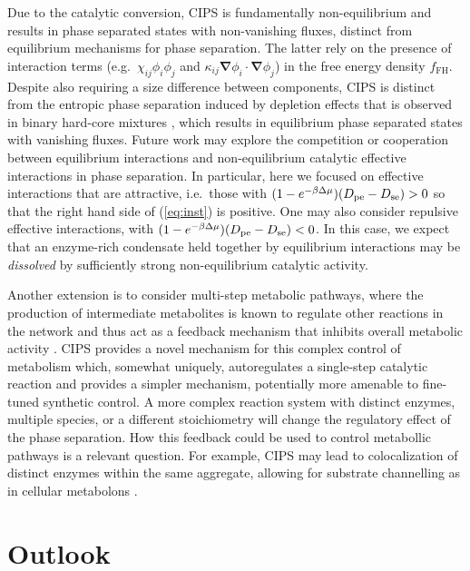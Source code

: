 Due to the catalytic conversion, CIPS is fundamentally non-equilibrium and results in phase separated states with non-vanishing fluxes, distinct from equilibrium mechanisms for phase separation. The latter rely on the presence of interaction terms (e.g.~$\chi_{ij}\phi_i\phi_j$ and $\kappa_{ij}\bm{\nabla} \phi_i \cdot \bm{\nabla} \phi_j$) in the free energy density $f_\mathrm{FH}$. Despite also requiring a size difference between components, CIPS is distinct from the entropic phase separation induced by depletion effects that is observed in binary hard-core mixtures \cite{frenkel_phase_1992}, which results in equilibrium phase separated states with vanishing fluxes. Future work may explore the competition or cooperation between equilibrium interactions and non-equilibrium catalytic effective interactions in phase separation. In particular, here we focused on effective interactions that are attractive, i.e.~those with $(1-e^{-\beta \Delta \mu})(D_{\mathrm{pe}}-D_{\mathrm{se}})>0$ so that the right hand side of (\ref{eq:inst}) is positive. One may also consider repulsive effective interactions, with $(1-e^{-\beta \Delta \mu})(D_{\mathrm{pe}}-D_{\mathrm{se}})<0$. In this case, we expect that an enzyme-rich condensate held together by equilibrium interactions may be {\it dissolved} by sufficiently strong non-equilibrium catalytic activity.

Another extension is to consider multi-step metabolic pathways, where the production of intermediate metabolites is known to regulate other reactions in the network and thus act as a feedback mechanism that inhibits overall metabolic activity \cite{oconnell_dynamic_2012,alam_self-inhibitory_2017}. CIPS provides a novel mechanism for this complex control of metabolism which, somewhat uniquely, autoregulates a single-step catalytic reaction and provides a simpler mechanism, potentially more amenable to fine-tuned synthetic control. A more complex reaction system with distinct enzymes, multiple species, or a different stoichiometry will change the regulatory effect of the phase separation. How this feedback could be used to control metabollic pathways is a relevant question. For example, CIPS may lead to colocalization of distinct enzymes within the same aggregate, allowing for substrate channelling as in cellular metabolons \cite{poshyvailo_does_2017, sweetlove_role_2018}.

\section{Outlook}

